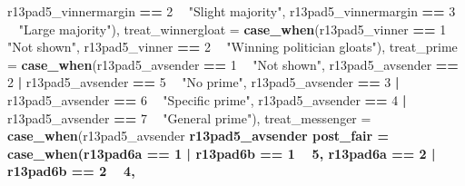 \documentclass[]{book}
\newenvironment{Shaded}{\begin{snugshade}}{\end{snugshade}}
\newcommand{\KeywordTok}[1]{\textcolor[rgb]{0.13,0.29,0.53}{\textbf{#1}}}
\newcommand{\DataTypeTok}[1]{\textcolor[rgb]{0.13,0.29,0.53}{#1}}
\newcommand{\DecValTok}[1]{\textcolor[rgb]{0.00,0.00,0.81}{#1}}
\newcommand{\StringTok}[1]{\textcolor[rgb]{0.31,0.60,0.02}{#1}}
\newcommand{\OperatorTok}[1]{\textcolor[rgb]{0.81,0.36,0.00}{\textbf{#1}}}
\newcommand{\NormalTok}[1]{#1}
\begin{document}
\begin{Shaded}
\begin{Highlighting}[]
{{{{{\NormalTok{                                       r13pad5_vinnermargin }\OperatorTok{==}\StringTok{ }\DecValTok{2} \OperatorTok{~}\StringTok{ "Slight majority"}\NormalTok{,}
\NormalTok{                                       r13pad5_vinnermargin }\OperatorTok{==}\StringTok{ }\DecValTok{3} \OperatorTok{~}\StringTok{ "Large majority"}\NormalTok{),}
         \DataTypeTok{treat_winnergloat =} \KeywordTok{case_when}\NormalTok{(r13pad5_vinner }\OperatorTok{==}\StringTok{ }\DecValTok{1} \OperatorTok{~}\StringTok{ "Not shown"}\NormalTok{,}
\NormalTok{                                     r13pad5_vinner }\OperatorTok{==}\StringTok{ }\DecValTok{2} \OperatorTok{~}\StringTok{ "Winning politician gloats"}\NormalTok{),}
        \DataTypeTok{treat_prime =} \KeywordTok{case_when}\NormalTok{(r13pad5_avsender }\OperatorTok{==}\StringTok{ }\DecValTok{1} \OperatorTok{~}\StringTok{ "Not shown"}\NormalTok{,}
\NormalTok{                               r13pad5_avsender }\OperatorTok{==}\StringTok{ }\DecValTok{2}  \OperatorTok{|}\StringTok{ }\NormalTok{r13pad5_avsender }\OperatorTok{==}\StringTok{ }\DecValTok{5} \OperatorTok{~}\StringTok{ "No prime"}\NormalTok{,}
\NormalTok{                               r13pad5_avsender }\OperatorTok{==}\StringTok{ }\DecValTok{3}  \OperatorTok{|}\StringTok{ }\NormalTok{r13pad5_avsender }\OperatorTok{==}\StringTok{ }\DecValTok{6} \OperatorTok{~}\StringTok{ "Specific prime"}\NormalTok{,}
\NormalTok{                               r13pad5_avsender }\OperatorTok{==}\StringTok{ }\DecValTok{4} \OperatorTok{|}\StringTok{ }\NormalTok{r13pad5_avsender }\OperatorTok{==}\StringTok{ }\DecValTok{7} \OperatorTok{~}\StringTok{ "General prime"}\NormalTok{),}
         \DataTypeTok{treat_messenger =} \KeywordTok{case_when}\NormalTok{(r13pad5_avsender }\OperatorTok{%in%}\StringTok{ }\DecValTok{3}\OperatorTok{:}\DecValTok{4} \OperatorTok{~}\StringTok{ "Political leader"}\NormalTok{,}
\NormalTok{                                   r13pad5_avsender }\OperatorTok{%in%}\StringTok{ }\DecValTok{6}\OperatorTok{:}\DecValTok{7} \OperatorTok{~}\StringTok{ "Local newspaper"}\NormalTok{),}
         \DataTypeTok{post_fair =} \KeywordTok{case_when}\NormalTok{(r13pad6a }\OperatorTok{==}\StringTok{ }\DecValTok{1} \OperatorTok{|}\StringTok{ }\NormalTok{r13pad6b }\OperatorTok{==}\StringTok{ }\DecValTok{1} \OperatorTok{~}\StringTok{ }\DecValTok{5}\NormalTok{,}
\NormalTok{                          r13pad6a }\OperatorTok{==}\StringTok{ }\DecValTok{2} \OperatorTok{|}\StringTok{ }\NormalTok{r13pad6b }\OperatorTok{==}\StringTok{ }\DecValTok{2} \OperatorTok{~}\StringTok{ }\DecValTok{4}\NormalTok{,}
}}}}}}}
\end{Highlighting}
\end{Shaded}
\end{document}
